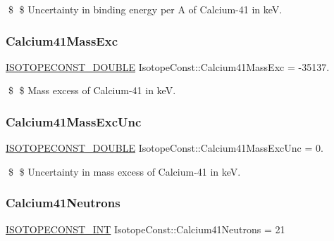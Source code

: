 \$ \$ Uncertainty in binding energy per A of Calcium-\/41 in keV. \mbox{\label{group___isotope_const-_calcium-_ca41_ga0cc48ba7de3977cf6b448126d8994f39}} 
\subsubsection{\texorpdfstring{Calcium41\+Mass\+Exc}{Calcium41MassExc}}
{\footnotesize\ttfamily \mbox{\hyperlink{group___isotope_const-_macros_ga8f45a7272ce02c0b4c65c44636ed719a}{I\+S\+O\+T\+O\+P\+E\+C\+O\+N\+S\+T\+\_\+\+D\+O\+U\+B\+LE}} Isotope\+Const\+::\+Calcium41\+Mass\+Exc = -\/35137.}

\$ \$ Mass excess of Calcium-\/41 in keV. \mbox{\label{group___isotope_const-_calcium-_ca41_ga58d11d3fddd83362f35f5ce206f40cfe}} 
\subsubsection{\texorpdfstring{Calcium41\+Mass\+Exc\+Unc}{Calcium41MassExcUnc}}
{\footnotesize\ttfamily \mbox{\hyperlink{group___isotope_const-_macros_ga8f45a7272ce02c0b4c65c44636ed719a}{I\+S\+O\+T\+O\+P\+E\+C\+O\+N\+S\+T\+\_\+\+D\+O\+U\+B\+LE}} Isotope\+Const\+::\+Calcium41\+Mass\+Exc\+Unc = 0.}

\$ \$ Uncertainty in mass excess of Calcium-\/41 in keV. \mbox{\label{group___isotope_const-_calcium-_ca41_ga2e46dc9def7c1f95c7fa0bf29cf703b0}} 
\subsubsection{\texorpdfstring{Calcium41\+Neutrons}{Calcium41Neutrons}}
{\footnotesize\ttfamily \mbox{\hyperlink{group___isotope_const-_macros_ga5f18360b3e99483a35c32d789e62621c}{I\+S\+O\+T\+O\+P\+E\+C\+O\+N\+S\+T\+\_\+\+I\+NT}} Isotope\+Const\+::\+Calcium41\+Neutrons = 21}

